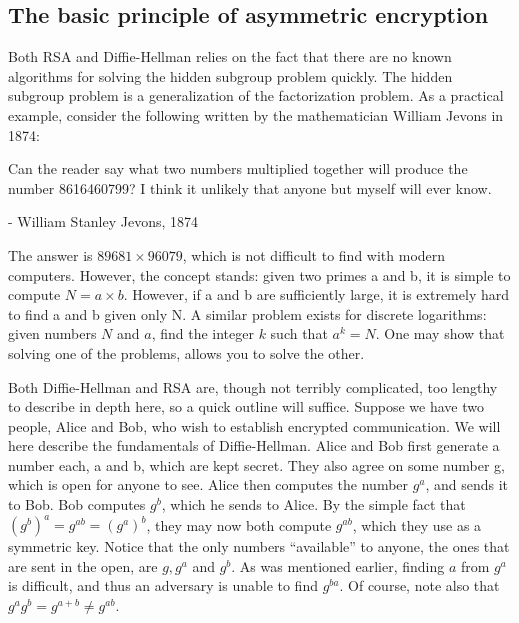 \documentclass[conference]{IEEEtran}
\begin{document}
\subsection{The basic principle of asymmetric encryption}
Both RSA and Diffie-Hellman relies on the fact that there are no known algorithms for solving the hidden subgroup problem quickly.
The hidden subgroup problem is a generalization of the factorization problem.
As a practical example, consider the following written by the mathematician William Jevons in 1874\cite{oldMathGuy}:
\begin{quoting}
Can the reader say what two numbers multiplied together will produce the number 8616460799? I think it unlikely that anyone but myself will ever know.
 
- William Stanley Jevons, 1874
\end{quoting}
The answer is $89681 \times 96079$, which is not difficult to find with modern computers.
However, the concept stands: given two primes a and b, it is simple to compute $N = a \times b$.
However, if a and b are sufficiently large, it is extremely hard to find a and b given only N.
A similar problem exists for discrete logarithms: given numbers $N$ and $a$, find the integer $k$ such that $a^k = N$.
One may show that solving one of the problems, allows you to solve the other.

Both Diffie-Hellman and RSA are, though not terribly complicated, too lengthy to describe in depth here, so a quick outline will suffice.
Suppose we have two people, Alice and Bob, who wish to establish encrypted communication.
We will here describe the fundamentals of Diffie-Hellman\cite{diffieHellman}.
Alice and Bob first generate a number each, a and b, which are kept secret.
They also agree on some number g, which is open for anyone to see.
Alice then computes the number $g^a$, and sends it to Bob.
Bob computes $g^b$, which he sends to Alice.
By the simple fact that $(g^b)^a = g^{ab} = (g^a)^b$, they may now both compute $g^{ab}$, which they use as a symmetric key.
Notice that the only numbers ``available'' to anyone, the ones that are sent in the open, are $g, g^a$ and $g^b$.
As was mentioned earlier, finding $a$ from $g^a$ is difficult, and thus an adversary is unable to find $g^{ba}$.
Of course, note also that $g^a g^b = g^{a+b}\neq g^{ab}$.

\end{document}
